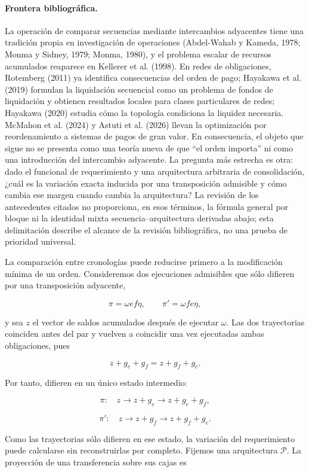 \documentclass[10pt,a5paper,twoside]{article}
\begin{document}
\paragraph{Frontera bibliográfica.}
La operación de comparar secuencias mediante intercambios adyacentes tiene una
tradición propia en investigación de operaciones (Abdel-Wahab y Kameda, 1978;
Monma y Sidney, 1979; Monma, 1980), y el problema escalar de recursos acumulados
reaparece en Kellerer et al. (1998). En redes de obligaciones, Rotemberg (2011)
ya identifica consecuencias del orden de pago; Hayakawa et al. (2019) formulan
la liquidación secuencial como un problema de fondos de liquidación y obtienen
resultados locales para clases particulares de redes; Hayakawa (2020) estudia
cómo la topología condiciona la liquidez necesaria. McMahon et al. (2024) y
Astuti et al. (2026) llevan la optimización por reordenamiento a sistemas de
pagos de gran valor. En consecuencia, el objeto que sigue no se presenta como
una teoría nueva de que ``el orden importa'' ni como una introducción del
intercambio adyacente. La pregunta más estrecha es otra: dado el funcional de
requerimiento y una arquitectura arbitraria de consolidación, ¿cuál es la
variación exacta inducida por una transposición admisible y cómo cambia ese
margen cuando cambia la arquitectura? La revisión de los antecedentes citados
no proporciona, en esos términos, la fórmula general por bloque ni la identidad
mixta secuencia--arquitectura derivadas abajo; esta delimitación describe el
alcance de la revisión bibliográfica, no una prueba de prioridad universal.

La comparación entre cronologías puede reducirse primero a la modificación
mínima de un orden. Consideremos dos ejecuciones admisibles que sólo difieren
por una transposición adyacente,

\[
\pi=\omega ef\eta,
\qquad
\pi'=\omega fe\eta,
\]

y sea \(z\) el vector de saldos acumulados después de ejecutar \(\omega\).
Las dos trayectorias coinciden antes del par y vuelven a coincidir una vez
ejecutadas ambas obligaciones, pues

\[
z+g_e+g_f=z+g_f+g_e.
\]

Por tanto, difieren en un único estado intermedio:

\[
\pi:\quad z\longrightarrow z+g_e\longrightarrow z+g_e+g_f,
\]

\[
\pi':\quad z\longrightarrow z+g_f\longrightarrow z+g_f+g_e.
\]

Como las trayectorias sólo difieren en ese estado, la variación del
requerimiento puede calcularse sin reconstruirlas por completo. Fijemos una
arquitectura \(\mathcal P\). La proyección de una transferencia sobre sus
cajas es
\end{document}
